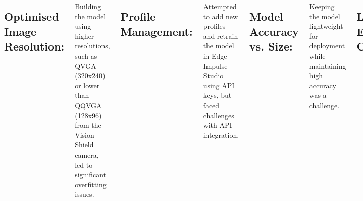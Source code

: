 \documentclass[25pt,a0paper, portrait]{tikzposter}
\begin{document}
\begin{columns}
{			
		}
		
		{
			
	\subsection*{Optimised Image Resolution:}  
	Building the model using higher resolutions, such as QVGA (320x240) or lower than QQVGA (128x96) from the Vision Shield camera, led to significant overfitting issues.  

	\subsection*{Profile Management:}  
	Attempted to add new profiles and retrain the model in Edge Impulse Studio using API keys, but faced challenges with API integration.  

	\subsection*{Model Accuracy vs. Size:}  
	Keeping the model lightweight for deployment while maintaining high accuracy was a challenge.  

	\subsection*{Lighting and Environmental Conditions:}  
	Struggled with varying lighting conditions (e.g., too bright or too dark) and environmental factors (e.g., glare or shadows).  

			
		}
		
		
		
		{
	\subsection*{Optimised Image Resolution:}
	Choose QQVGA (160x120) resolution to balance image quality, which reduces overfitting during model training while ensuring accurate recognition.

	\subsection*{Profile Management:}
	Manually update the dataset and retrain the model in Edge Impulse Studio \cite{edgeimpulse:2025}, prioritizing accuracy over automation.

	\subsection*{Model Accuracy vs. Size:}
	Apply model quantization (int8) \cite{mathworksint8quantization:2025} techniques to reduce model size without compromising accuracy.

}
\end{columns}
\end{document}

